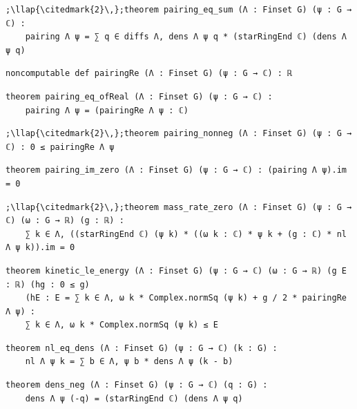 \begin{lstlisting}[style=leancat]
;\llap{\citedmark{2}\,};theorem pairing_eq_sum (Λ : Finset G) (ψ : G → ℂ) :
    pairing Λ ψ = ∑ q ∈ diffs Λ, dens Λ ψ q * (starRingEnd ℂ) (dens Λ ψ q)
\end{lstlisting}

\begin{lstlisting}[style=leancat]
noncomputable def pairingRe (Λ : Finset G) (ψ : G → ℂ) : ℝ
\end{lstlisting}

\begin{lstlisting}[style=leancat]
theorem pairing_eq_ofReal (Λ : Finset G) (ψ : G → ℂ) :
    pairing Λ ψ = (pairingRe Λ ψ : ℂ)
\end{lstlisting}

\begin{lstlisting}[style=leancat]
;\llap{\citedmark{2}\,};theorem pairing_nonneg (Λ : Finset G) (ψ : G → ℂ) : 0 ≤ pairingRe Λ ψ
\end{lstlisting}

\begin{lstlisting}[style=leancat]
theorem pairing_im_zero (Λ : Finset G) (ψ : G → ℂ) : (pairing Λ ψ).im = 0
\end{lstlisting}

\begin{lstlisting}[style=leancat]
;\llap{\citedmark{2}\,};theorem mass_rate_zero (Λ : Finset G) (ψ : G → ℂ) (ω : G → ℝ) (g : ℝ) :
    ∑ k ∈ Λ, ((starRingEnd ℂ) (ψ k) * ((ω k : ℂ) * ψ k + (g : ℂ) * nl Λ ψ k)).im = 0
\end{lstlisting}

\begin{lstlisting}[style=leancat]
theorem kinetic_le_energy (Λ : Finset G) (ψ : G → ℂ) (ω : G → ℝ) (g E : ℝ) (hg : 0 ≤ g)
    (hE : E = ∑ k ∈ Λ, ω k * Complex.normSq (ψ k) + g / 2 * pairingRe Λ ψ) :
    ∑ k ∈ Λ, ω k * Complex.normSq (ψ k) ≤ E
\end{lstlisting}

\begin{lstlisting}[style=leancat]
theorem nl_eq_dens (Λ : Finset G) (ψ : G → ℂ) (k : G) :
    nl Λ ψ k = ∑ b ∈ Λ, ψ b * dens Λ ψ (k - b)
\end{lstlisting}

\begin{lstlisting}[style=leancat]
theorem dens_neg (Λ : Finset G) (ψ : G → ℂ) (q : G) :
    dens Λ ψ (-q) = (starRingEnd ℂ) (dens Λ ψ q)
\end{lstlisting}

